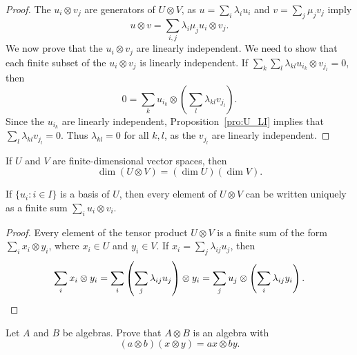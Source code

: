 \begin{proof}
	The $u_i\otimes v_j$ are generators of $U\otimes V$, as  
    $u=\sum_i\lambda_iu_i$ and $v=\sum_j\mu_jv_j$ imply 
	\[
    u\otimes v=\sum_{i,j}\lambda_i\mu_ju_i\otimes v_j.
    \]
	We now prove that the $u_i\otimes v_j$ are linearly independent. We need to show that
	each finite subset of the $u_i\otimes v_j$
	is linearly independent. If $\sum_k\sum_l\lambda_{kl}u_{i_k}\otimes
	v_{j_l}=0$, then 
	\[
0=\sum_{k}u_{i_k}\otimes\left(\sum_{l}\lambda_{kl}v_{j_l}\right).\]
    Since  
	the $u_{i_k}$ are linearly independent, Proposition~\ref{pro:U_LI}
	implies that $\sum_{l}\lambda_{kl}v_{j_l}=0$. Thus $\lambda_{kl}=0$ for all 
	$k,l$, as the $v_{j_l}$ are linearly independent. 
\end{proof}

If $U$ and $V$ are finite-dimensional vector spaces, then 
\[
	\dim(U\otimes V)=(\dim U)(\dim V).
\]

\begin{corollary}
	If $\{u_i:i\in I\}$ is a basis of $U$, then every element of $U\otimes V$
	can be written uniquely as a finite sum $\sum_{i}u_i\otimes v_i$.
\end{corollary}

\begin{proof}
	Every element of the tensor product $U\otimes V$ is a finite sum 
	of the form $\sum_i x_i\otimes y_i$, where $x_i\in U$ and $y_i\in V$. If  
	$x_i=\sum_j\lambda_{ij}u_j$, then 
	\[
		\sum_i x_i\otimes y_i=\sum_i\left(\sum_j\lambda_{ij}u_j\right)\otimes y_i		
		=\sum_j u_j\otimes\left(\sum_i\lambda_{ij}y_i\right).\qedhere 
	\]
\end{proof}

%

\begin{exercise}
\label{xca:tensor_algebras}
    Let $A$ and $B$ be algebras. Prove that $A\otimes B$ 
    is an algebra with 
	\[
		(a\otimes b)(x\otimes y)=ax\otimes by.
	\]
\end{exercise}

